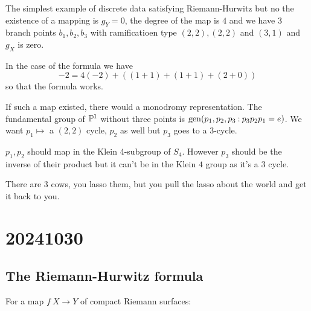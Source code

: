 \documentclass[12pt]{memoir}
\begin{document}
 \begin{Ex}
    The simplest example of discrete data satisfying Riemann-Hurwitz but no the existence of a mapping is $g_Y=0$, the degree of the map is $4$ and we have $3$ branch points $b_1,b_2,b_3$ with ramificatioen type $(2,2),(2,2)$ and $(3,1)$ and $g_X$ is zero.\par
    In the case of the formula we have 
    $$-2=4(-2)+((1+1)+(1+1)+(2+0))$$
    so that the formula works.\par
    If such a map existed, there would a monodromy representation. The fundamental group of $\mathbb{P}^1$ without three points is $\operatorname{gen}(p_1,p_2,p_3\mathbin{:} p_3p_2p_1=e)$. We want $p_1\mapsto$ a $(2,2)$ cycle, $p_2$ as well but $p_3$ goes to a $3$-cycle.\par
    $p_1,p_2$ should map in the Klein 4-subgroup of $S_4$. However $p_3$ should be the inverse of their product but it can't be in the Klein $4$ group as it's a 3 cycle.
 \end{Ex}

 \begin{Rmk}
    There are 3 cows, you lasso them, but you pull the lasso about the world and get it back to you.
 \end{Rmk}

\section{20241030}

\subsection{The Riemann-Hurwitz formula}

For a map $f\: X\to Y$ of compact Riemann surfaces:
\end{document}
